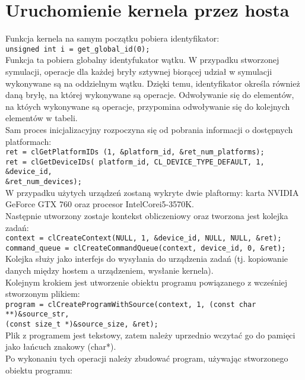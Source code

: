 \section{Uruchomienie kernela przez hosta}
Funkcja kernela na samym początku pobiera identyfikator: \\
\centering\verb+unsigned int i = get_global_id(0);+\\\flushleft
Funkcja ta pobiera globalny identyfukator wątku. W przypadku stworzonej symulacji, operacje dla każdej bryły sztywnej biorącej udział w symulacji wykonywane są na oddzielnym wątku. Dzięki temu, identyfikator określa również daną bryłę, na której wykonywane są operacje. Odwoływanie się do elementów, na któych wykonywane są operacje, przypomina odwoływanie się do kolejnych elementów w tabeli. \\
Sam proces inicjalizacyjny rozpoczyna się od pobrania informacji o dostępnych platformach:\\
\centering\verb+ret = clGetPlatformIDs (1, &platform_id, &ret_num_platforms);+\\
\verb+ret = clGetDeviceIDs( platform_id, CL_DEVICE_TYPE_DEFAULT, 1, &device_id,+ \\
\verb+&ret_num_devices);+\\ \flushleft
W przypadku użytych urządzeń zostaną wykryte dwie plaftormy: karta NVIDIA GeForce GTX 760 oraz procesor Intel\textregistered Core\texttrademark i5-3570K. \\ 
Następnie utworzony zostaje kontekst obliczeniowy oraz tworzona jest kolejka zadań:\\
\centering\verb+context = clCreateContext(NULL, 1, &device_id, NULL, NULL, &ret);+\\
\verb+command_queue = clCreateCommandQueue(context, device_id, 0, &ret);+\\\flushleft
Kolejka służy jako interfejs do wysyłania do urządzenia zadań (tj. kopiowanie danych między hostem a urządzeniem, wysłanie kernela). \\
Kolejnym krokiem jest utworzenie obiektu programu powiązanego z wcześniej stworzonym plikiem:\\
\centering\verb+program = clCreateProgramWithSource(context, 1, (const char **)&source_str,+\\
\verb+(const size_t *)&source_size, &ret);+\\\flushleft
Plik z programem jest tekstowy, zatem należy uprzednio wczytać go do pamięci jako łańcuch znakowy (char*). \\
Po wykonaniu tych operacji należy zbudować program, używając stworzonego obiektu programu:\\
